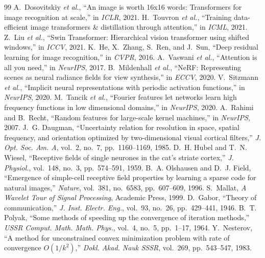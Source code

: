 \documentclass[10pt,twocolumn]{article}
\begin{document}
\begin{thebibliography}{99}
\fontsize{6.8pt}{7.8pt}\selectfont
\setlength{\itemsep}{-0.8pt}
\setlength{\parskip}{0pt}
 A.~Dosovitskiy \textit{et al.}, ``An image is worth 16x16 words: Transformers for image recognition at scale,'' in \textit{ICLR}, 2021.
 H.~Touvron \textit{et al.}, ``Training data-efficient image transformers \& distillation through attention,'' in \textit{ICML}, 2021.
 Z.~Liu \textit{et al.}, ``Swin Transformer: Hierarchical vision transformer using shifted windows,'' in \textit{ICCV}, 2021.
 K.~He, X.~Zhang, S.~Ren, and J.~Sun, ``Deep residual learning for image recognition,'' in \textit{CVPR}, 2016.
 A.~Vaswani \textit{et al.}, ``Attention is all you need,'' in \textit{NeurIPS}, 2017.
 B.~Mildenhall \textit{et al.}, ``NeRF: Representing scenes as neural radiance fields for view synthesis,'' in \textit{ECCV}, 2020.
 V.~Sitzmann \textit{et al.}, ``Implicit neural representations with periodic activation functions,'' in \textit{NeurIPS}, 2020.
 M.~Tancik \textit{et al.}, ``Fourier features let networks learn high frequency functions in low dimensional domains,'' in \textit{NeurIPS}, 2020.
 A.~Rahimi and B.~Recht, ``Random features for large-scale kernel machines,'' in \textit{NeurIPS}, 2007.
 J.~G. Daugman, ``Uncertainty relation for resolution in space, spatial frequency, and orientation optimized by two-dimensional visual cortical filters,'' \textit{J. Opt. Soc. Am. A}, vol.~2, no.~7, pp.~1160--1169, 1985.
 D.~H. Hubel and T.~N. Wiesel, ``Receptive fields of single neurones in the cat's striate cortex,'' \textit{J. Physiol.}, vol.~148, no.~3, pp.~574--591, 1959.
 B.~A. Olshausen and D.~J. Field, ``Emergence of simple-cell receptive field properties by learning a sparse code for natural images,'' \textit{Nature}, vol.~381, no.~6583, pp.~607--609, 1996.
 S.~Mallat, \textit{A Wavelet Tour of Signal Processing}, Academic Press, 1999.
 D.~Gabor, ``Theory of communication,'' \textit{J. Inst. Electr. Eng.}, vol.~93, no.~26, pp.~429--441, 1946.
 B.~T. Polyak, ``Some methods of speeding up the convergence of iteration methods,'' \textit{USSR Comput. Math. Math. Phys.}, vol.~4, no.~5, pp.~1--17, 1964.
 Y.~Nesterov, ``A method for unconstrained convex minimization problem with rate of convergence $O(1/k^2)$,'' \textit{Dokl. Akad. Nauk SSSR}, vol.~269, pp.~543--547, 1983.

\end{thebibliography}
\end{document}
